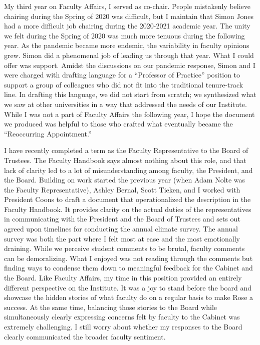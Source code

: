 \documentclass[
  letterpaper,
  DIV=11,
  numbers=noendperiod]{scrreprt}
\begin{document}
My third year on Faculty Affairs, I served as co-chair. People
mistakenly believe chairing during the Spring of 2020 was difficult, but
I maintain that Simon Jones had a more difficult job chairing during the
2020-2021 academic year. The unity we felt during the Spring of 2020 was
much more tenuous during the following year. As the pandemic became more
endemic, the variability in faculty opinions grew. Simon did a
phenomenal job of leading us through that year. What I could offer was
support. Amidst the discussions on our pandemic response, Simon and I
were charged with drafting language for a ``Professor of Practice''
position to support a group of colleagues who did not fit into the
traditional tenure-track line. In drafting this language, we did not
start from scratch; we synthesized what we saw at other universities in
a way that addressed the needs of our Institute. While I was not a part
of Faculty Affairs the following year, I hope the document we produced
was helpful to those who crafted what eventually became the
``Reoccurring Appointment.''

I have recently completed a term as the Faculty Representative to the
Board of Trustees. The Faculty Handbook says almost nothing about this
role, and that lack of clarity led to a lot of misunderstanding among
faculty, the President, and the Board. Building on work started the
previous year (when Adam Nolte was the Faculty Representative), Ashley
Bernal, Scott Tieken, and I worked with President Coons to draft a
document that operationalized the description in the Faculty Handbook.
It provides clarity on the actual duties of the representatives in
communicating with the President and the Board of Trustees and sets out
agreed upon timelines for conducting the annual climate survey. The
annual survey was both the part where I felt most at ease and the most
emotionally draining. While we perceive student comments to be brutal,
faculty comments can be demoralizing. What I enjoyed was not reading
through the comments but finding ways to condense them down to
meaningful feedback for the Cabinet and the Board. Like Faculty Affairs,
my time in this position provided an entirely different perspective on
the Institute. It was a joy to stand before the board and showcase the
hidden stories of what faculty do on a regular basis to make Rose a
success. At the same time, balancing those stories to the Board while
simultaneously clearly expressing concerns felt by faculty to the
Cabinet was extremely challenging. I still worry about whether my
responses to the Board clearly communicated the broader faculty
sentiment.
\end{document}
